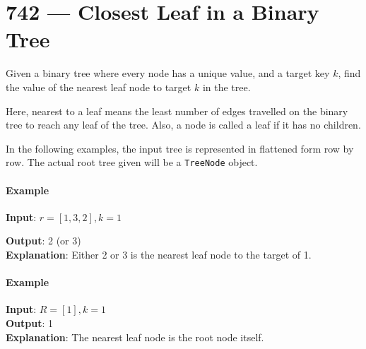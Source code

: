 \documentclass[a4paper,12pt]{article}
\begin{document}
\section{742 --- Closest Leaf in a Binary Tree}
Given a binary tree where every node has a unique value, and a target key $k$, find the value of the nearest leaf node to target $k$ in the tree.
\par
Here, nearest to a leaf means the least number of edges travelled on the binary tree to reach any leaf of the tree. Also, a node is called a leaf if it has no children.
\par
In the following examples, the input tree is represented in flattened form row by row. The actual root tree given will be a \texttt{TreeNode} object.
\paragraph*{Example}
\begin{flushleft}
\textbf{Input}: $r=[1,3,2], k=1$
\begin{figure}[H]
\end{figure}
\textbf{Output}: 2 (or 3)
\\
\textbf{Explanation}: Either 2 or 3 is the nearest leaf node to the target of 1.
\end{flushleft}
\paragraph*{Example}
\begin{flushleft}
\textbf{Input}: $R = [1], k=1$
\\
\textbf{Output}: 1
\\
\textbf{Explanation}: The nearest leaf node is the root node itself.
\end{flushleft}
\end{document}
